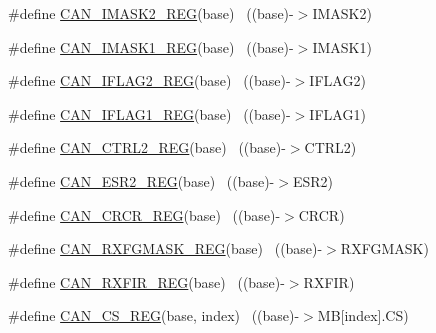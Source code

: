 \begin{DoxyCompactItemize}
\item 
\#define \hyperlink{group___c_a_n___register___accessor___macros_gade3a98dd75556ce2b6f1eb832e6e0824}{C\+A\+N\+\_\+\+I\+M\+A\+S\+K2\+\_\+\+R\+EG}(base)                                      ~((base)-\/$>$I\+M\+A\+S\+K2)
\item 
\#define \hyperlink{group___c_a_n___register___accessor___macros_ga80231dca89e90952e2e8e7b3b11da333}{C\+A\+N\+\_\+\+I\+M\+A\+S\+K1\+\_\+\+R\+EG}(base)                                      ~((base)-\/$>$I\+M\+A\+S\+K1)
\item 
\#define \hyperlink{group___c_a_n___register___accessor___macros_ga3266d1a00bf3a4fc3c464e9992bbd20c}{C\+A\+N\+\_\+\+I\+F\+L\+A\+G2\+\_\+\+R\+EG}(base)                                      ~((base)-\/$>$I\+F\+L\+A\+G2)
\item 
\#define \hyperlink{group___c_a_n___register___accessor___macros_ga516d5bdd31eb73adc70fcd9e8db6d6a7}{C\+A\+N\+\_\+\+I\+F\+L\+A\+G1\+\_\+\+R\+EG}(base)                                      ~((base)-\/$>$I\+F\+L\+A\+G1)
\item 
\#define \hyperlink{group___c_a_n___register___accessor___macros_ga3c0ddaade29c100875426d48d55b2d86}{C\+A\+N\+\_\+\+C\+T\+R\+L2\+\_\+\+R\+EG}(base)                                        ~((base)-\/$>$C\+T\+R\+L2)
\item 
\#define \hyperlink{group___c_a_n___register___accessor___macros_gac7a8b908fcbf6e6ab0e1334e4fc016c2}{C\+A\+N\+\_\+\+E\+S\+R2\+\_\+\+R\+EG}(base)                                          ~((base)-\/$>$E\+S\+R2)
\item 
\#define \hyperlink{group___c_a_n___register___accessor___macros_ga0521321bfb9492998974d3ad267a8141}{C\+A\+N\+\_\+\+C\+R\+C\+R\+\_\+\+R\+EG}(base)                                          ~((base)-\/$>$C\+R\+CR)
\item 
\#define \hyperlink{group___c_a_n___register___accessor___macros_gaba4437c8c233beb2457cd30d2be5defa}{C\+A\+N\+\_\+\+R\+X\+F\+G\+M\+A\+S\+K\+\_\+\+R\+EG}(base)                                  ~((base)-\/$>$R\+X\+F\+G\+M\+A\+SK)
\item 
\#define \hyperlink{group___c_a_n___register___accessor___macros_ga87e42ff030ce54ff9e1a0c09c05ad4de}{C\+A\+N\+\_\+\+R\+X\+F\+I\+R\+\_\+\+R\+EG}(base)                                        ~((base)-\/$>$R\+X\+F\+IR)
\item 
\#define \hyperlink{group___c_a_n___register___accessor___macros_gac99a637d119cf05e14250a1465275522}{C\+A\+N\+\_\+\+C\+S\+\_\+\+R\+EG}(base,  index)                                  ~((base)-\/$>$MB\mbox{[}index\mbox{]}.CS)

\end{DoxyCompactItemize}
